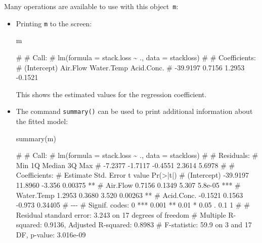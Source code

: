 \documentclass[
  a4paper,
]{article}
\newenvironment{Shaded}{\begin{snugshade}}{\end{snugshade}}
\newcommand{\FunctionTok}[1]{\textcolor[rgb]{0.00,0.00,0.00}{#1}}
\newcommand{\NormalTok}[1]{#1}
\theoremstyle{definition}
\theoremstyle{definition}
\theoremstyle{definition}
\theoremstyle{definition}
\theoremstyle{remark}
\begin{document}
Many operations are available to use with this object~\texttt{m}:

\begin{itemize}
\item
  Printing \texttt{m} to the screen:

\begin{Shaded}
\begin{Highlighting}[]
\NormalTok{  m}
\end{Highlighting}
\end{Shaded}

\begin{Shaded}
\begin{Highlighting}[]
\NormalTok{\# }
\NormalTok{\# Call:}
\NormalTok{\# lm(formula = stack.loss \textasciitilde{} ., data = stackloss)}
\NormalTok{\# }
\NormalTok{\# Coefficients:}
\NormalTok{\# (Intercept)     Air.Flow   Water.Temp   Acid.Conc.  }
\NormalTok{\#    {-}39.9197       0.7156       1.2953      {-}0.1521}
\end{Highlighting}
\end{Shaded}

  This shows the estimated values for the regression coefficient.
\item
  The command \texttt{summary()} can be used to print additional
  information about the fitted model:

\begin{Shaded}
\begin{Highlighting}[]
  \FunctionTok{summary}\NormalTok{(m)}
\end{Highlighting}
\end{Shaded}

\begin{Shaded}
\begin{Highlighting}[]
\NormalTok{\# }
\NormalTok{\# Call:}
\NormalTok{\# lm(formula = stack.loss \textasciitilde{} ., data = stackloss)}
\NormalTok{\# }
\NormalTok{\# Residuals:}
\NormalTok{\#     Min      1Q  Median      3Q     Max }
\NormalTok{\# {-}7.2377 {-}1.7117 {-}0.4551  2.3614  5.6978 }
\NormalTok{\# }
\NormalTok{\# Coefficients:}
\NormalTok{\#             Estimate Std. Error t value Pr(\textgreater{}|t|)    }
\NormalTok{\# (Intercept) {-}39.9197    11.8960  {-}3.356  0.00375 ** }
\NormalTok{\# Air.Flow      0.7156     0.1349   5.307  5.8e{-}05 ***}
\NormalTok{\# Water.Temp    1.2953     0.3680   3.520  0.00263 ** }
\NormalTok{\# Acid.Conc.   {-}0.1521     0.1563  {-}0.973  0.34405    }
\NormalTok{\# {-}{-}{-}}
\NormalTok{\# Signif. codes:  0 \textquotesingle{}***\textquotesingle{} 0.001 \textquotesingle{}**\textquotesingle{} 0.01 \textquotesingle{}*\textquotesingle{} 0.05 \textquotesingle{}.\textquotesingle{} 0.1 \textquotesingle{} \textquotesingle{} 1}
\NormalTok{\# }
\NormalTok{\# Residual standard error: 3.243 on 17 degrees of freedom}
\NormalTok{\# Multiple R{-}squared:  0.9136,  Adjusted R{-}squared:  0.8983 }
\NormalTok{\# F{-}statistic:  59.9 on 3 and 17 DF,  p{-}value: 3.016e{-}09}
\end{Highlighting}
\end{Shaded}


\end{itemize}
\end{document}

